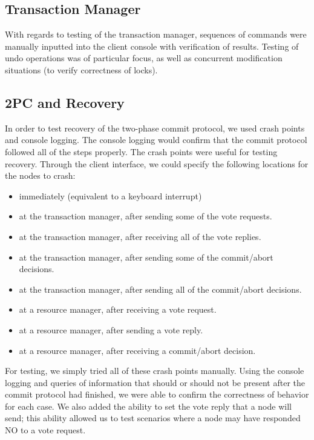 \documentclass[11pt]{article}
\begin{document}
\subsection*{Transaction Manager}

With regards to testing of the transaction manager, sequences of commands were manually inputted into the client console with verification of results. Testing of undo operations was of particular focus, as well as concurrent modification situations (to verify correctness of locks).\par

\subsection*{2PC and Recovery}

In order to test recovery of the two-phase commit protocol, we used crash points and console logging. The console logging would confirm that the commit protocol followed all of the steps properly. The crash points were useful for testing recovery. Through the client interface, we could specify the following locations for the nodes to crash:
\begin{itemize}
\item immediately (equivalent to a keyboard interrupt)
\item at the transaction manager, after sending some of the vote requests.
\item at the transaction manager, after receiving all of the vote replies.
\item at the transaction manager, after sending some of the commit/abort decisions.
\item at the transaction manager, after sending all of the commit/abort decisions.
\item at a resource manager, after receiving a vote request.
\item at a resource manager, after sending a vote reply.
\item at a resource manager, after receiving a commit/abort decision.
\end{itemize}
For testing, we simply tried all of these crash points manually. Using the console logging and queries of information that should or should not be present after the commit protocol had finished, we were able to confirm the correctness of behavior for each case. We also added the ability to set the vote reply that a node will send; this ability allowed us to test scenarios where a node may have responded NO to a vote request.\par
\end{document}
